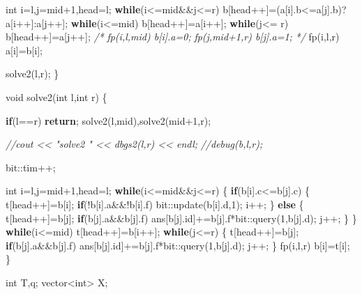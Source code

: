 \documentclass[
]{article}
\newenvironment{Shaded}{}{}
\newcommand{\CommentTok}[1]{\textcolor[rgb]{0.38,0.63,0.69}{\textit{#1}}}
\newcommand{\ControlFlowTok}[1]{\textcolor[rgb]{0.00,0.44,0.13}{\textbf{#1}}}
\newcommand{\DataTypeTok}[1]{\textcolor[rgb]{0.56,0.13,0.00}{#1}}
\newcommand{\DecValTok}[1]{\textcolor[rgb]{0.25,0.63,0.44}{#1}}
\newcommand{\NormalTok}[1]{#1}
\begin{document}
\begin{Shaded}
\begin{Highlighting}[]
    \DataTypeTok{int}\NormalTok{ i=l,j=mid+}\DecValTok{1}\NormalTok{,head=l;}
    \ControlFlowTok{while}\NormalTok{(i\textless{}=mid\&\&j\textless{}=r) b[head++]=(a[i].b\textless{}=a[j].b)?a[i++]:a[j++];}
    \ControlFlowTok{while}\NormalTok{(i\textless{}=mid) b[head++]=a[i++];}
    \ControlFlowTok{while}\NormalTok{(j\textless{}=  r) b[head++]=a[j++];}
\CommentTok{/*}
\CommentTok{    fp(i,l,mid)   b[i].a=0;}
\CommentTok{    fp(j,mid+1,r) b[j].a=1;}
\CommentTok{*/}
\NormalTok{    fp(i,l,r) a[i]=b[i];}

\NormalTok{    solve2(l,r);}
\NormalTok{\}}

\DataTypeTok{void}\NormalTok{ solve2(}\DataTypeTok{int}\NormalTok{ l,}\DataTypeTok{int}\NormalTok{ r)}
\NormalTok{\{}

    \ControlFlowTok{if}\NormalTok{(l==r) }\ControlFlowTok{return}\NormalTok{;}
\NormalTok{    solve2(l,mid),solve2(mid+}\DecValTok{1}\NormalTok{,r);}

    \CommentTok{//cout \textless{}\textless{} "solve2 " \textless{}\textless{} dbgs2(l,r) \textless{}\textless{} endl;}
    \CommentTok{//debug(b,l,r);}

\NormalTok{    bit::tim++;}

    \DataTypeTok{int}\NormalTok{ i=l,j=mid+}\DecValTok{1}\NormalTok{,head=l;}
    \ControlFlowTok{while}\NormalTok{(i\textless{}=mid\&\&j\textless{}=r)}
\NormalTok{    \{}
        \ControlFlowTok{if}\NormalTok{(b[i].c\textless{}=b[j].c)}
\NormalTok{        \{}
\NormalTok{            t[head++]=b[i];}
            \ControlFlowTok{if}\NormalTok{(!b[i].a\&\&!b[i].f) bit::update(b[i].d,}\DecValTok{1}\NormalTok{);}
\NormalTok{            i++;}
\NormalTok{        \}}
        \ControlFlowTok{else}
\NormalTok{        \{}
\NormalTok{            t[head++]=b[j];}
            \ControlFlowTok{if}\NormalTok{(b[j].a\&\&b[j].f) ans[b[j].id]+=b[j].f*bit::query(}\DecValTok{1}\NormalTok{,b[j].d);}
\NormalTok{            j++;}
\NormalTok{        \}}
\NormalTok{    \}}
    \ControlFlowTok{while}\NormalTok{(i\textless{}=mid) t[head++]=b[i++];}
    \ControlFlowTok{while}\NormalTok{(j\textless{}=r)}
\NormalTok{    \{}
\NormalTok{        t[head++]=b[j];}
        \ControlFlowTok{if}\NormalTok{(b[j].a\&\&b[j].f) ans[b[j].id]+=b[j].f*bit::query(}\DecValTok{1}\NormalTok{,b[j].d);}
\NormalTok{        j++;}
\NormalTok{    \}}
\NormalTok{    fp(i,l,r) b[i]=t[i];}
\NormalTok{\}}

\DataTypeTok{int}\NormalTok{ T,q;}
\NormalTok{vector\textless{}}\DataTypeTok{int}\NormalTok{\textgreater{} X;}


\end{Highlighting}
\end{Shaded}
\end{document}
